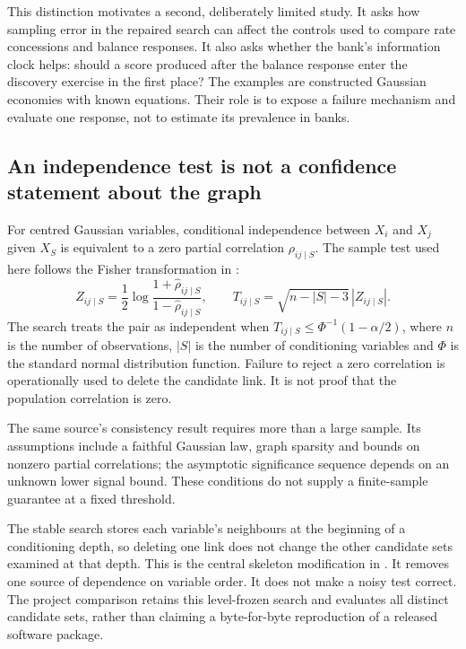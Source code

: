 This distinction motivates a second, deliberately limited study. It asks how
sampling error in the repaired search can affect the controls used to compare
rate concessions and balance responses. It also asks whether the bank's
information clock helps: should a score produced after the balance response
enter the discovery exercise in the first place? The examples are constructed
Gaussian economies with known equations. Their role is to expose a failure
mechanism and evaluate one response, not to estimate its prevalence in banks.

\subsection{An independence test is not a confidence statement about the graph}

For centred Gaussian variables, conditional independence between $X_i$ and
$X_j$ given $X_S$ is equivalent to a zero partial correlation
$\rho_{ij\mid S}$. The sample test used here follows the Fisher transformation
in \citet[Section 2.2.2, equation (3)]{kalisch2007}:
\begin{equation}
 Z_{ij\mid S}=\frac12\log\frac{1+\widehat\rho_{ij\mid S}}
                                  {1-\widehat\rho_{ij\mid S}},\qquad
 T_{ij\mid S}=\sqrt{n-|S|-3}\,|Z_{ij\mid S}|.
 \label{closure30:fisher}
\end{equation}
The search treats the pair as independent when
$T_{ij\mid S}\leq\Phi^{-1}(1-\alpha/2)$, where $n$ is the number of
observations, $|S|$ is the number of conditioning variables and $\Phi$ is the
standard normal distribution function. Failure to reject a zero correlation
is operationally used to delete the candidate link. It is not proof that the
population correlation is zero.

The same source's consistency result requires more than a large sample. Its
assumptions include a faithful Gaussian law, graph sparsity and bounds on
nonzero partial correlations; the asymptotic significance sequence depends on
an unknown lower signal bound. These conditions do not supply a finite-sample
guarantee at a fixed threshold. \citep[Assumptions A1--A4 and Theorem 1,
pp.~619--620]{kalisch2007}

The stable search stores each variable's neighbours at the beginning of a
conditioning depth, so deleting one link does not change the other candidate
sets examined at that depth. This is the central skeleton modification in
\citet[Section 4.1, Algorithm 4.1 and Theorem 3]{exec13_latentr_colombo2014}. It removes
one source of dependence on variable order. It does not make a noisy test
correct. The project comparison retains this level-frozen search and evaluates
all distinct candidate sets, rather than claiming a byte-for-byte reproduction
of a released software package.

